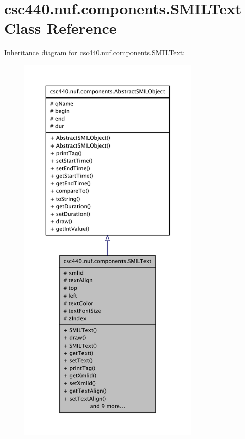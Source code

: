 \hypertarget{classcsc440_1_1nuf_1_1components_1_1_s_m_i_l_text}{\section{csc440.\-nuf.\-components.\-S\-M\-I\-L\-Text Class Reference}
\label{classcsc440_1_1nuf_1_1components_1_1_s_m_i_l_text}
}


Inheritance diagram for csc440.\-nuf.\-components.\-S\-M\-I\-L\-Text\-:
\nopagebreak
\begin{figure}[H]
\begin{center}
\leavevmode
\includegraphics[height=550pt]{classcsc440_1_1nuf_1_1components_1_1_s_m_i_l_text__inherit__graph}
\end{center}
\end{figure}


